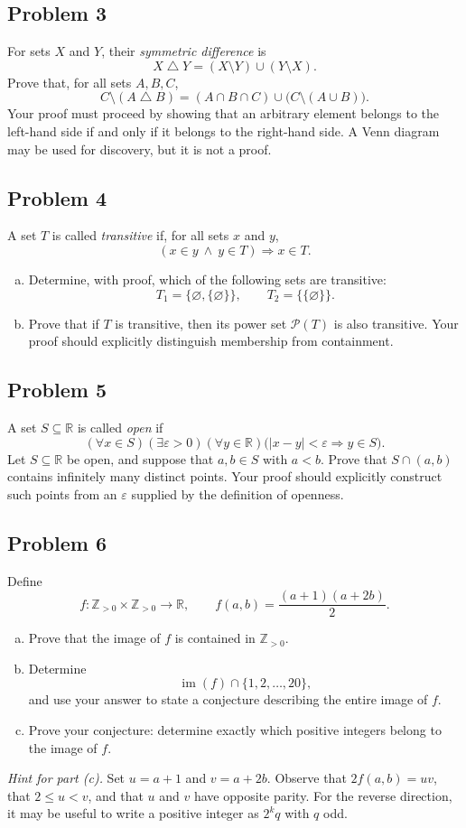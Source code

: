 \documentclass[11pt]{article}
\newcommand{\Z}{\mathbb{Z}}
\newcommand{\R}{\mathbb{R}}
\newcommand{\problem}[2]{\subsection*{Problem #1 \hfill \normalfont[#2 points]}}
\begin{document}
\problem{3}{4}
For sets $X$ and $Y$, their \emph{symmetric difference} is
\[
    X\mathbin{\triangle}Y=(X\setminus Y)\cup(Y\setminus X).
\]
Prove that, for all sets $A,B,C$,
\[
    C\setminus(A\mathbin{\triangle}B)
    =
    (A\cap B\cap C)\cup\bigl(C\setminus(A\cup B)\bigr).
\]
Your proof must proceed by showing that an arbitrary element belongs to the left-hand side if and only if it belongs to the right-hand side. A Venn diagram may be used for discovery, but it is not a proof.

\problem{4}{5}
A set $T$ is called \emph{transitive} if, for all sets $x$ and $y$,
\[
    (x\in y\ \wedge\ y\in T)\Longrightarrow x\in T.
\]
\begin{enumerate}[(a)]
    \item Determine, with proof, which of the following sets are transitive:
    \[
        T_1=\{\varnothing,\{\varnothing\}\},
        \qquad
        T_2=\{\{\varnothing\}\}.
    \]

    \item Prove that if $T$ is transitive, then its power set $\mathcal{P}(T)$ is also transitive.
    Your proof should explicitly distinguish membership from containment.
\end{enumerate}

\problem{5}{5}
A set $S\subseteq\R$ is called \emph{open} if
\[
    (\forall x\in S)(\exists\varepsilon>0)(\forall y\in\R)
    \bigl(|x-y|<\varepsilon\Longrightarrow y\in S\bigr).
\]
Let $S\subseteq\R$ be open, and suppose that $a,b\in S$ with $a<b$.
Prove that $S\cap(a,b)$ contains infinitely many distinct points.
Your proof should explicitly construct such points from an $\varepsilon$ supplied by the definition of openness.

\problem{6}{7}
Define
\[
    f:\Z_{>0}\times\Z_{>0}\longrightarrow\R,
    \qquad
    f(a,b)=\frac{(a+1)(a+2b)}{2}.
\]
\begin{enumerate}[(a)]
    \item Prove that the image of $f$ is contained in $\Z_{>0}$.

    \item Determine
    \[
        \operatorname{im}(f)\cap\{1,2,\ldots,20\},
    \]
    and use your answer to state a conjecture describing the entire image of $f$.

    \item Prove your conjecture: determine exactly which positive integers belong to the image of $f$.
\end{enumerate}

\textit{Hint for part (c).}
Set $u=a+1$ and $v=a+2b$. Observe that $2f(a,b)=uv$, that $2\le u<v$, and that $u$ and $v$ have opposite parity. For the reverse direction, it may be useful to write a positive integer as $2^kq$ with $q$ odd.
\end{document}

